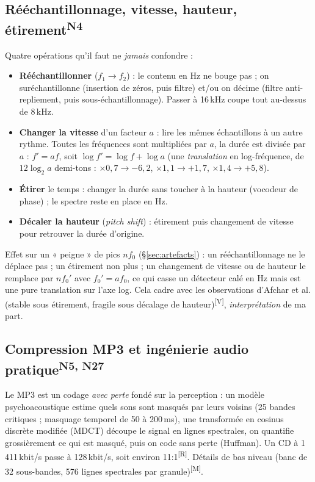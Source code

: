 \documentclass[10pt,a4paper]{article}
\newcommand{\sV}{\textsuperscript{\scriptsize\textcolor{green!40!black}{[V]}}}
\newcommand{\sR}{\textsuperscript{\scriptsize\textcolor{orange!80!black}{[R]}}}
\newcommand{\sM}{\textsuperscript{\scriptsize\textcolor{red!70!black}{[M]}}}
\newcommand{\nref}[1]{\textsuperscript{\scriptsize\textcolor{black!55}{#1}}}
\begin{document}
\subsection{Rééchantillonnage, vitesse, hauteur, étirement\nref{N4}}\label{sec:resamp}
Quatre opérations qu'il faut ne \emph{jamais} confondre :
\begin{itemize}
  \item \textbf{Rééchantillonner} ($f_1\to f_2$) : le contenu en Hz ne bouge pas ; on suréchantillonne (insertion de zéros, puis filtre) et/ou on décime (filtre anti-repliement, puis sous-échantillonnage). Passer à 16\,kHz coupe tout au-dessus de 8\,kHz.
  \item \textbf{Changer la vitesse} d'un facteur $a$ : lire les mêmes échantillons à un autre rythme. Toutes les fréquences sont multipliées par $a$, la durée est divisée par $a$ : $f'=af$, soit $\log f'=\log f+\log a$ (une \emph{translation} en log-fréquence, de $12\log_2 a$ demi-tons : $\times0{,}7\to-6{,}2$, $\times1{,}1\to+1{,}7$, $\times1{,}4\to+5{,}8$).
  \item \textbf{Étirer} le temps : changer la durée sans toucher à la hauteur (vocodeur de phase) ; le spectre reste en place en Hz.
  \item \textbf{Décaler la hauteur} (\emph{pitch shift}) : étirement puis changement de vitesse pour retrouver la durée d'origine.
\end{itemize}
Effet sur un « peigne » de pics $nf_0$ (§\ref{sec:artefacts}) : un rééchantillonnage ne le déplace pas ; un étirement non plus ; un changement de vitesse ou de hauteur le remplace par $nf_0'$ avec $f_0'=af_0$, ce qui casse un détecteur calé en Hz mais est une pure translation sur l'axe log. Cela cadre avec les observations d'Afchar et al. (stable sous étirement, fragile sous décalage de hauteur)\sV, \emph{interprétation} de ma part.

\subsection{Compression MP3 et ingénierie audio pratique\nref{N5, N27}}\label{sec:mp3}
Le MP3 est un codage \emph{avec perte} fondé sur la perception : un modèle psychoacoustique estime quels sons sont masqués par leurs voisins (25 bandes critiques ; masquage temporel de 50 à 200\,ms), une transformée en cosinus discrète modifiée (MDCT) découpe le signal en lignes spectrales, on quantifie grossièrement ce qui est masqué, puis on code sans perte (Huffman). Un CD à 1\,411\,kbit/s passe à 128\,kbit/s, soit environ 11:1\sR. Détails de bas niveau (banc de 32 sous-bandes, 576 lignes spectrales par granule)\sM.
\end{document}
